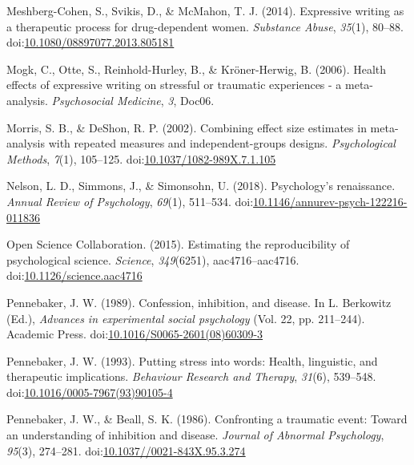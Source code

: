 \documentclass[man, mask]{apa6}
\theoremstyle{definition}
\theoremstyle{definition}
\theoremstyle{definition}
\theoremstyle{remark}
\begin{document}
\hypertarget{ref-Meshberg-Cohen2014}{}
Meshberg-Cohen, S., Svikis, D., \& McMahon, T. J. (2014). Expressive
writing as a therapeutic process for drug-dependent women.
\emph{Substance Abuse}, \emph{35}(1), 80--88.
doi:\href{https://doi.org/10.1080/08897077.2013.805181}{10.1080/08897077.2013.805181}

\hypertarget{ref-Mogk2006}{}
Mogk, C., Otte, S., Reinhold-Hurley, B., \& Kröner-Herwig, B. (2006).
Health effects of expressive writing on stressful or traumatic
experiences - a meta-analysis. \emph{Psychosocial Medicine}, \emph{3},
Doc06.

\hypertarget{ref-Morris2002}{}
Morris, S. B., \& DeShon, R. P. (2002). Combining effect size estimates
in meta-analysis with repeated measures and independent-groups designs.
\emph{Psychological Methods}, \emph{7}(1), 105--125.
doi:\href{https://doi.org/10.1037/1082-989X.7.1.105}{10.1037/1082-989X.7.1.105}

\hypertarget{ref-Nelson2018}{}
Nelson, L. D., Simmons, J., \& Simonsohn, U. (2018). Psychology's
renaissance. \emph{Annual Review of Psychology}, \emph{69}(1), 511--534.
doi:\href{https://doi.org/10.1146/annurev-psych-122216-011836}{10.1146/annurev-psych-122216-011836}

\hypertarget{ref-OpenScienceCollaboration2015}{}
Open Science Collaboration. (2015). Estimating the reproducibility of
psychological science. \emph{Science}, \emph{349}(6251),
aac4716--aac4716.
doi:\href{https://doi.org/10.1126/science.aac4716}{10.1126/science.aac4716}

\hypertarget{ref-Pennebaker1989}{}
Pennebaker, J. W. (1989). Confession, inhibition, and disease. In L.
Berkowitz (Ed.), \emph{Advances in experimental social psychology} (Vol.
22, pp. 211--244). Academic Press.
doi:\href{https://doi.org/10.1016/S0065-2601(08)60309-3}{10.1016/S0065-2601(08)60309-3}

\hypertarget{ref-Pennebaker1993}{}
Pennebaker, J. W. (1993). Putting stress into words: Health, linguistic,
and therapeutic implications. \emph{Behaviour Research and Therapy},
\emph{31}(6), 539--548.
doi:\href{https://doi.org/10.1016/0005-7967(93)90105-4}{10.1016/0005-7967(93)90105-4}

\hypertarget{ref-Pennebaker1986}{}
Pennebaker, J. W., \& Beall, S. K. (1986). Confronting a traumatic
event: Toward an understanding of inhibition and disease. \emph{Journal
of Abnormal Psychology}, \emph{95}(3), 274--281.
doi:\href{https://doi.org/10.1037//0021-843X.95.3.274}{10.1037//0021-843X.95.3.274}
\end{document}
